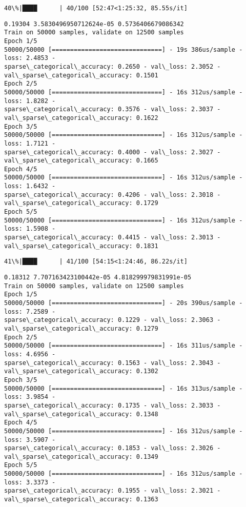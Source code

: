 \documentclass[11pt]{article}
\begin{document}
    \begin{Verbatim}[commandchars=\\\{\}]
 40\%|████      | 40/100 [52:47<1:25:32, 85.55s/it]
    \end{Verbatim}

    \begin{Verbatim}[commandchars=\\\{\}]
0.19304 3.5830496950712624e-05 0.5736406679086342
Train on 50000 samples, validate on 12500 samples
Epoch 1/5
50000/50000 [==============================] - 19s 386us/sample - loss: 2.4853 -
sparse\_categorical\_accuracy: 0.2650 - val\_loss: 2.3052 -
val\_sparse\_categorical\_accuracy: 0.1501
Epoch 2/5
50000/50000 [==============================] - 16s 312us/sample - loss: 1.8282 -
sparse\_categorical\_accuracy: 0.3576 - val\_loss: 2.3037 -
val\_sparse\_categorical\_accuracy: 0.1622
Epoch 3/5
50000/50000 [==============================] - 16s 312us/sample - loss: 1.7121 -
sparse\_categorical\_accuracy: 0.4000 - val\_loss: 2.3027 -
val\_sparse\_categorical\_accuracy: 0.1665
Epoch 4/5
50000/50000 [==============================] - 16s 312us/sample - loss: 1.6432 -
sparse\_categorical\_accuracy: 0.4206 - val\_loss: 2.3018 -
val\_sparse\_categorical\_accuracy: 0.1729
Epoch 5/5
50000/50000 [==============================] - 16s 312us/sample - loss: 1.5908 -
sparse\_categorical\_accuracy: 0.4415 - val\_loss: 2.3013 -
val\_sparse\_categorical\_accuracy: 0.1831
    \end{Verbatim}

    \begin{Verbatim}[commandchars=\\\{\}]
 41\%|████      | 41/100 [54:15<1:24:46, 86.22s/it]
    \end{Verbatim}

    \begin{Verbatim}[commandchars=\\\{\}]
0.18312 7.707163423100442e-05 4.818299979831991e-05
Train on 50000 samples, validate on 12500 samples
Epoch 1/5
50000/50000 [==============================] - 20s 390us/sample - loss: 7.2589 -
sparse\_categorical\_accuracy: 0.1229 - val\_loss: 2.3063 -
val\_sparse\_categorical\_accuracy: 0.1279
Epoch 2/5
50000/50000 [==============================] - 16s 311us/sample - loss: 4.6956 -
sparse\_categorical\_accuracy: 0.1563 - val\_loss: 2.3043 -
val\_sparse\_categorical\_accuracy: 0.1302
Epoch 3/5
50000/50000 [==============================] - 16s 313us/sample - loss: 3.9854 -
sparse\_categorical\_accuracy: 0.1735 - val\_loss: 2.3033 -
val\_sparse\_categorical\_accuracy: 0.1348
Epoch 4/5
50000/50000 [==============================] - 16s 312us/sample - loss: 3.5907 -
sparse\_categorical\_accuracy: 0.1853 - val\_loss: 2.3026 -
val\_sparse\_categorical\_accuracy: 0.1349
Epoch 5/5
50000/50000 [==============================] - 16s 312us/sample - loss: 3.3373 -
sparse\_categorical\_accuracy: 0.1955 - val\_loss: 2.3021 -
val\_sparse\_categorical\_accuracy: 0.1363
    \end{Verbatim}
\end{document}
